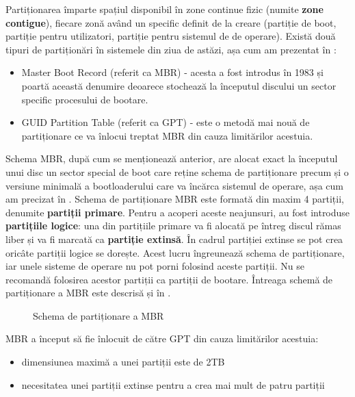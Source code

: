Partiționarea împarte spațiul disponibil în zone continue fizic (numite \textbf{zone contigue}), fiecare zonă
având un specific definit de la creare (partiție de boot, partiție pentru
utilizatori, partiție pentru sistemul de de operare). Există două tipuri de
partiționări în sistemele din ziua de astăzi, așa cum am prezentat în
:

\begin{itemize}
	\item Master Boot Record (referit ca MBR) - acesta a fost introdus în
		1983 și poartă această denumire deoarece stochează la începutul
		discului un sector specific procesului de bootare.
	\item GUID Partition Table (referit ca GPT) - este o metodă mai nouă de
		partiționare ce va înlocui treptat MBR din cauza limitărilor
		acestuia.
\end{itemize}

Schema MBR, după cum se menționează anterior, are alocat exact la începutul unui
disc un sector special de boot care reține schema de partiționare precum și o
versiune minimală a bootloaderului care va încărca sistemul de operare, așa cum am precizat în .
Schema de partiționare MBR este formată din maxim 4
partiții, denumite \textbf{partiții primare}. Pentru a acoperi aceste neajunsuri, au fost
introduse \textbf{partițiile logice}: una din partițiile primare va fi alocată pe întreg
discul rămas liber și va fi marcată ca \textbf{partiție extinsă}. În cadrul partiției
extinse se pot crea oricâte partiții logice se dorește. Acest lucru îngreunează
schema de partiționare, iar unele sisteme de operare nu pot porni folosind
aceste partiții. Nu se recomandă folosirea acestor partiții ca partiții de
bootare. Întreaga schemă de partiționare a MBR este descrisă și în
.

\begin{figure}[htbp]
	\centering
	\def\svgwidth{\columnwidth}
	
	\caption{Schema de partiționare a MBR}
        \label{fig:storage:mbr}
\end{figure}

MBR a început să fie înlocuit de către GPT din cauza limitărilor acestuia:
\begin{itemize}
	\item dimensiunea maximă a unei partiții este de 2TB
	\item necesitatea unei partiții extinse pentru a crea mai mult de patru partiții
\end{itemize}

